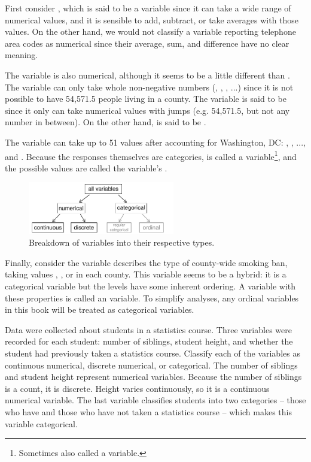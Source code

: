 First consider , which is said to be a  variable since it can take a wide range of numerical values, and it is sensible to add, subtract, or take averages with those values. On the other hand, we would not classify a variable reporting telephone area codes as numerical since their average, sum, and difference have no clear meaning.

The  variable is also numerical, although it seems to be a little different than . The variable  can only take whole non-negative numbers (, , , ...) since it is not possible to have 54,571.5 people living in a county. The variable  is said to be  since it only can take numerical values with jumps (e.g. 54,571.5, but not any number in between). On the other hand,  is said to be .

The variable  can take up to 51 values after accounting for Washington, DC: , , ..., and . Because the responses themselves are categories,  is called a  variable\footnote{Sometimes also called a  variable.}, and the possible values are called the variable's .

\begin{figure}
\centering
\includegraphics[width=0.57\textwidth]{01/figures/variables/variables}
\caption{Breakdown of variables into their respective types.}
\label{variables}
\end{figure}

Finally, consider the  variable describes the type of county-wide smoking ban, taking values , , or  in each county. This variable seems to be a hybrid: it is a categorical variable but the levels have some inherent ordering. A variable with these properties is called an  variable. To simplify analyses, any ordinal variables in this book will be treated as categorical variables.


\begin{example}{Data were collected about students in a statistics course. Three variables were recorded for each student: number of siblings, student height, and whether the student had previously taken a statistics course. Classify each of the variables as continuous numerical, discrete numerical, or categorical.}
The number of siblings and student height represent numerical variables. Because the number of siblings is a count, it is discrete. Height varies continuously, so it is a continuous numerical variable. The last variable classifies students into two categories -- those who have and those who have not taken a statistics course -- which makes this variable categorical.
\end{example}

